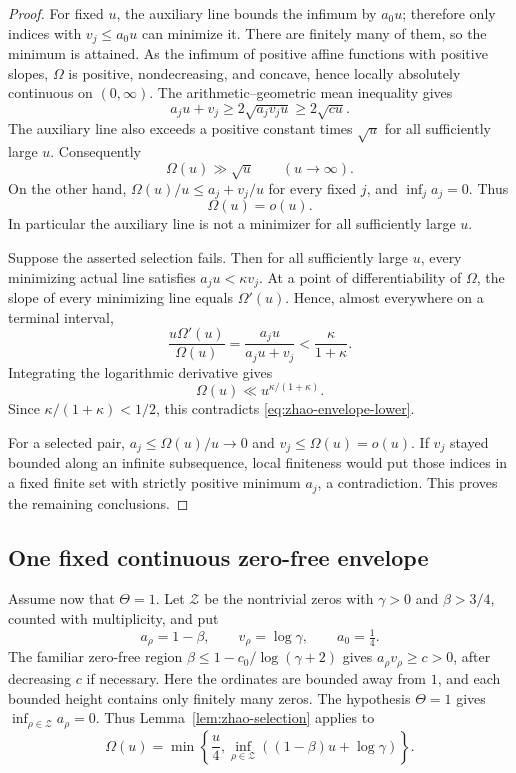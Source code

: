 \documentclass[11pt,a4paper]{article}
\numberwithin{equation}{section}
\theoremstyle{definition}\newtheorem{definition}[theorem]{Definition}
\theoremstyle{remark}\newtheorem{remark}[theorem]{Remark}
\begin{document}
\begin{proof}
For fixed $u$, the auxiliary line bounds the infimum by $a_0u$;
therefore only indices with $v_j\leq a_0u$ can minimize it. There
are finitely many of them, so the minimum is attained.
As the infimum of positive affine functions with positive slopes,
$\Omega$ is positive, nondecreasing, and concave, hence locally
absolutely continuous on $(0,\infty)$. The arithmetic--geometric
mean inequality gives
\[
 a_ju+v_j\geq2\sqrt{a_jv_ju}\geq2\sqrt{cu}.
\]
The auxiliary line also exceeds a positive constant times $\sqrt u$
for all sufficiently large $u$. Consequently
\begin{equation}
 \label{eq:zhao-envelope-lower}
 \Omega(u)\gg\sqrt u\qquad(u\to\infty).
\end{equation}
On the other hand, $\Omega(u)/u\leq a_j+v_j/u$ for every fixed
$j$, and $\inf_j a_j=0$. Thus
\begin{equation}
 \label{eq:zhao-envelope-sublinear}
 \Omega(u)=o(u).
\end{equation}
In particular the auxiliary line is not a minimizer for all
sufficiently large $u$.

Suppose the asserted selection fails. Then for all sufficiently
large $u$, every minimizing actual line satisfies $a_ju<\kappa v_j$.
At a point of differentiability of $\Omega$, the slope of every
minimizing line equals $\Omega'(u)$. Hence, almost everywhere on a
terminal interval,
\[
 \frac{u\Omega'(u)}{\Omega(u)}
 =\frac{a_ju}{a_ju+v_j}
 <\frac{\kappa}{1+\kappa}.
\]
Integrating the logarithmic derivative gives
\[
 \Omega(u)\ll u^{\kappa/(1+\kappa)}.
\]
Since $\kappa/(1+\kappa)<1/2$, this contradicts
\eqref{eq:zhao-envelope-lower}.

For a selected pair, $a_j\leq\Omega(u)/u\to0$ and
$v_j\leq\Omega(u)=o(u)$. If $v_j$ stayed bounded along an
infinite subsequence, local finiteness would put those indices in
a fixed finite set with strictly positive minimum $a_j$, a
contradiction. This proves the remaining conclusions.
\end{proof}

\subsection{One fixed continuous zero-free envelope}

Assume now that $\Theta=1$. Let $\mathcal Z$ be the nontrivial
zeros with $\gamma>0$ and $\beta>3/4$, counted with multiplicity,
and put
\[
 a_\rho=1-\beta,\qquad v_\rho=\log\gamma,
 \qquad a_0=\tfrac14.
\]
The familiar zero-free region
$\beta\leq1-c_0/\log(\gamma+2)$ gives
$a_\rho v_\rho\geq c>0$, after decreasing $c$ if necessary.
Here the ordinates are bounded away from $1$, and each bounded
height contains only finitely many zeros. The hypothesis $\Theta=1$
gives $\inf_{\rho\in\mathcal Z}a_\rho=0$.
Thus Lemma~\ref{lem:zhao-selection} applies to
\begin{equation}
 \label{eq:zhao-discrete-envelope}
 \Omega(u)=\min\left\{\frac u4,
           \inf_{\rho\in\mathcal Z}
                  ((1-\beta)u+\log\gamma)\right\}.
\end{equation}
\end{document}
